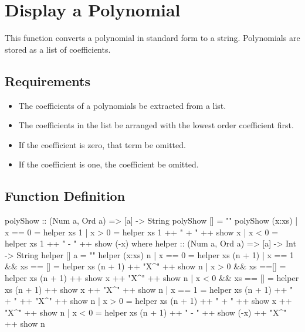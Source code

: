 \section{Display a Polynomial}
This function converts a polynomial in standard form to a string.  Polynomials are stored as a list of coefficients.

\subsection{Requirements}
\begin{itemize}
\item The coefficients of a polynomials  be extracted from a list.
\item The coefficients in the list  be arranged with the lowest order coefficient first.
\item If the coefficient is zero, that term  be omitted.
\item If the coefficient is one, the coefficient  be omitted.
\end{itemize}

\subsection{Function Definition}
\begin{code}
polyShow :: (Num a, Ord a) => [a] -> String
polyShow [] = ""
polyShow (x:xs)
  | x == 0        = helper xs 1
  | x > 0         = helper xs 1 ++ " + " ++ show x
  | x < 0         = helper xs 1 ++ " - " ++ show (-x)
  where 
    helper :: (Num a, Ord a) => [a] -> Int -> String
    helper [] a = ""
    helper (x:xs) n
      | x == 0              = helper xs (n + 1)
      | x == 1 && xs == []  = helper xs (n + 1) ++ "X^" ++ show n
      | x > 0 && xs ==[]    = helper xs (n + 1) ++  show x ++ "X^" ++ show n
      | x < 0 && xs == []   = helper xs (n + 1) ++ show x ++ "X^" ++ show n
      | x == 1              = helper xs (n + 1) ++ " + " ++ "X^" ++ show n
      | x > 0               = helper xs (n + 1) ++ " + " ++ show x ++ "X^" ++ show n
      | x < 0               = helper xs (n + 1) ++ " - " ++ show (-x) ++ "X^" ++ show n
\end{code}

